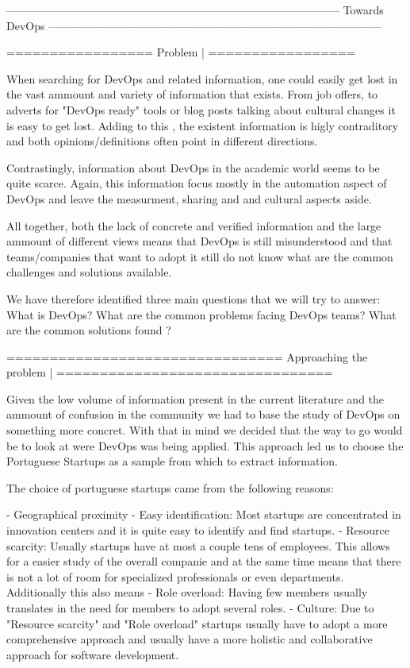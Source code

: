 ------------------------------------------------------------------------------------------
			Towards DevOps
------------------------------------------------------------------------------------------

=================
	Problem |
=================

When searching for DevOps and related information, one could easily get lost in the vast ammount and variety of information that exists. From job offers, to adverts for "DevOps ready" tools or blog posts talking about cultural changes it is easy to get lost. Adding to this , the existent information is higly contraditory and both opinions/definitions often point in different directions. 

Contrastingly, information about DevOps in the academic world seems to be quite scarce. Again, this information focus mostly in the automation aspect of DevOps and leave the measurment, sharing and and cultural aspects aside. 

All together, both the lack of concrete and verified information and the large ammount of different views means that DevOps is still misunderstood and that teams/companies that want to adopt it still do not know what are the common challenges and solutions available.

We have therefore identified three main questions that we will try to answer:
	What is DevOps?
	What are the common problems facing DevOps teams?
	What are the common solutions found ?

================================
	Approaching the problem |
================================

Given the low volume of information present in the current literature and the ammount of confusion in the community we had to base the study of DevOps on something more concret. With that in mind we decided that the way to go would be to look at were DevOps was being applied. This approach led us to choose the Portuguese Startups as a sample from which to extract information.

The choice of portuguese startups came from the following reasons:
	
	- Geographical proximity
	- Easy identification: Most startups are concentrated in innovation centers and it is quite easy to identify and find startups.
	- Resource scarcity: Usually startups have at most a couple tens of employees. This allows for a easier study of the overall companie and at the same time means that there is not a lot of room for specialized professionals or even departments. Additionally this also means 
	- Role overload: Having few members usually translates in the need for members to adopt several roles.
	- Culture: Due to "Resource scarcity" and "Role overload" startups usually have to adopt a more comprehensive approach and usually have a more holistic and collaborative approach for software development.

